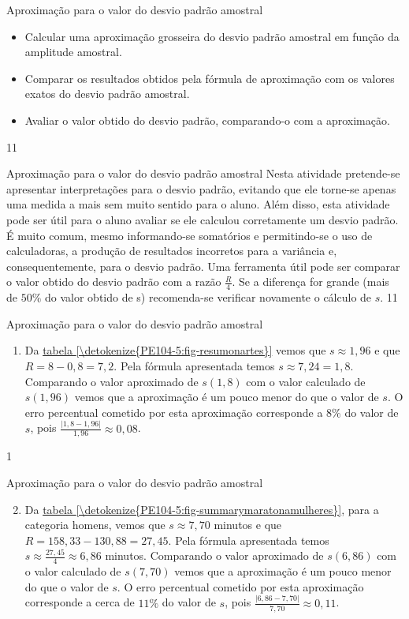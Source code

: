 {\clearmargin
\def\currentcolor{session2}
\begin{objectives}{Aproximação para o valor do desvio padrão amostral}
{
\begin{itemize}
\item Calcular uma aproximação grosseira do desvio padrão amostral em função da amplitude amostral.

\item Comparar os resultados obtidos pela fórmula de aproximação com os valores exatos do desvio padrão amostral.

\item Avaliar o valor obtido do desvio padrão, comparando-o com a aproximação.
\end{itemize}
}{1}{1}
\end{objectives}
\begin{sugestions}{Aproximação para o valor do desvio padrão amostral}
{
Nesta atividade pretende-se apresentar interpretações para o desvio padrão, evitando que ele torne-se apenas uma medida a mais sem muito sentido para o aluno. Além disso, esta atividade pode ser útil para o aluno avaliar se ele calculou corretamente um desvio padrão. É muito comum, mesmo informando-se somatórios e permitindo-se o uso de calculadoras, a produção de resultados incorretos para a variância e, consequentemente, para o desvio padrão. Uma ferramenta útil pode ser comparar o valor obtido do desvio padrão com a razão $\frac{R}{4}$. Se a diferença for grande (mais de $50\%$ do valor obtido de s) recomenda-se verificar novamente o cálculo de $s$.
}{1}{1}
\end{sugestions}
\begin{answer}{Aproximação para o valor do desvio padrão amostral}
{
\begin{enumerate}
\item Da \hyperref[\detokenize{PE104-5:fig-resumonartes}]{tabela \ref{\detokenize{PE104-5:fig-resumonartes}}} vemos que $s\approx1{,}96$ e que $R=8-0{,}8=7{,}2$. Pela fórmula apresentada temos $s\approx7{,}24=1{,}8$. Comparando o valor aproximado de $s (1{,}8)$ com o valor calculado de $s (1{,}96)$ vemos que a aproximação é um pouco menor do que o valor de $s$. O erro percentual cometido por esta aproximação corresponde a $8\%$ do valor de $s$, pois $\frac{|1{,}8-1{,}96|}{1{,}96}\approx0{,}08$.
\end{enumerate}
}{1}
\end{answer}
\begin{answer}{Aproximação para o valor do desvio padrão amostral}
{
\begin{enumerate}\setcounter{enumi}{1}
\item Da \hyperref[\detokenize{PE104-5:fig-summarymaratonamulheres}]{tabela \ref{\detokenize{PE104-5:fig-summarymaratonamulheres}}}, para a categoria homens, vemos que $s\approx7,70$ minutos e que $R=158{,}33-130{,}88=27{,}45$. Pela fórmula apresentada temos $s\approx\frac{27{,}45}{4}\approx6{,}86$ minutos. Comparando o valor aproximado de $s (6{,}86)$ com o valor calculado de $s (7{,}70)$ vemos que a aproximação é um pouco menor do que o valor de $s$. O erro percentual cometido por esta aproximação corresponde a cerca de $11\%$ do valor de $s$, pois $\frac{|6{,}86-7{,}70|}{7,70}\approx0{,}11$.


\end{enumerate}}
\end{answer}}
